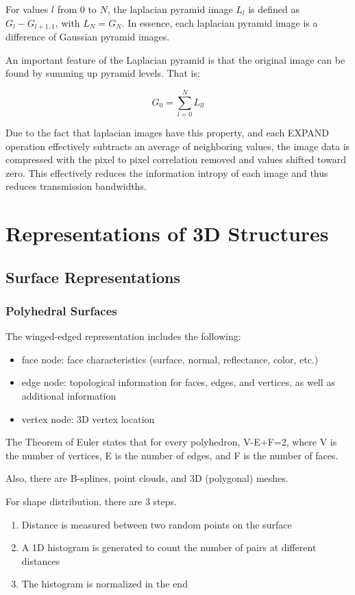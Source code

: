 \documentclass{article}
\begin{document}
\begin{multicols}{2}
For values $l$ from 0 to $N$, the laplacian pyramid image $L_l$ is defined as $G_l - G_{l+1,1}$, with $L_N = G_N$. In essence, each laplacian pyramid image is a difference of Gaussian pyramid images.

An important feature of the Laplacian pyramid is that the original image can be found by summing up pyramid levels. That is:

$$
G_0 = \sum_{l=0}^{N}L_{ll}
$$

Due to the fact that laplacian images have this property, and each EXPAND operation effectively subtracts an average of neighboring values, the image data is compressed with the pixel to pixel correlation removed and values shifted toward zero. This effectively reduces the information intropy of each image and thus reduces transmission bandwidths.

\section{Representations of 3D Structures}
\subsection{Surface Representations}
\subsubsection{Polyhedral Surfaces}

The winged-edged representation includes the following:

\begin{itemize}
  \item {face node: face characteristics (surface, normal, reflectance, color, etc.)}
  \item {edge node: topological information for faces, edges, and vertices, as well as additional information}
  \item {vertex node: 3D vertex location}
\end{itemize}

The Theorem of Euler states that for every polyhedron, V-E+F=2, where V is the number of vertices, E is the number of edges, and F is the number of faces.

Also, there are B-splines, point clouds, and 3D (polygonal) meshes.

\vspace{2mm}

For shape distribution, there are 3 steps.
\begin{enumerate}
  \item {Distance is measured between two random points on the surface}
  \item {A 1D histogram is generated to count the number of pairs at different distances}
  \item {The histogram is normalized in the end}
\end{enumerate}


\end{multicols}
\end{document}
